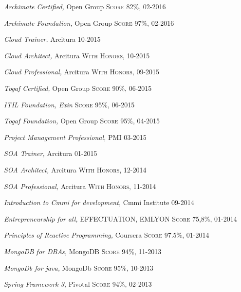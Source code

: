 \documentclass[10pt,a4paper]{article}
\begin{document}
\spacedhrule{-0.2em}{-0.4em}



\headedsection
  {{\sl \textit {Archimate Certified},} Open Group}
  {\textsc{Score 82\%, 02-2016}}

\headedsection
  {{\sl \textit {Archimate Foundation},} Open Group}
  {\textsc{Score 97\%, 02-2016}}
  
\headedsection
  {{\sl \textit {Cloud Trainer},} Arcitura}
  {\textsc{ 10-2015}}  

\headedsection
  {{\sl \textit {Cloud Architect},} Arcitura }
  {\textsc{With Honors, 10-2015}} 

\headedsection
  {{\sl \textit {Cloud Professional},} Arcitura }
  {\textsc{With Honors, 09-2015}} 


\headedsection
  {{\sl \textit {Togaf Certified},} Open Group}
  {\textsc{Score 90\%, 06-2015}} 

\headedsection
  {\sl \textit{ITIL Foundation}, Exin}
  {\textsc{Score 95\%, 06-2015}}   
  
\headedsection
  {{\sl \textit {Togaf Foundation},} Open Group}
  {\textsc{Score 95\%, 04-2015}}     

\headedsection
  {{\sl \textit {Project Management Professional},} PMI}
  {\textsc{03-2015}} 

\headedsection
  {{\sl \textit {SOA Trainer},} Arcitura}
  {\textsc{01-2015}}  

\headedsection
  {{\sl \textit {SOA Architect},} Arcitura}
  {\textsc{With Honors, 12-2014}}  

\headedsection
  {{\sl \textit {SOA Professional},} Arcitura}
  {\textsc{With Honors, 11-2014}} 
 

\headedsection
  {{\sl \textit {Introduction to Cmmi for development},}  Cmmi Institute}
  {\textsc{ 09-2014}} 
  
\headedsection
  {{\sl \textit {Entrepreneurship for all},} EFFECTUATION, EMLYON}
  {\textsc{Score 75,8\%, 01-2014}} 

\headedsection
  {{\sl \textit {Principles of Reactive Programming},} Coursera}
  {\textsc{Score 97.5\%, 01-2014}} 

\headedsection
  {{\sl \textit {MongoDB for DBAs},} MongoDB}
  {\textsc{Score 94\%, 11-2013}} 
  
\headedsection
  {{\sl \textit {MongoDb for java},} MongoDb}
  {\textsc{Score 95\%, 10-2013}} 
  
\headedsection
  {{\sl \textit {Spring Framework 3},} Pivotal}
  {\textsc{Score 94\%, 02-2013}} 
  
\end{document}
